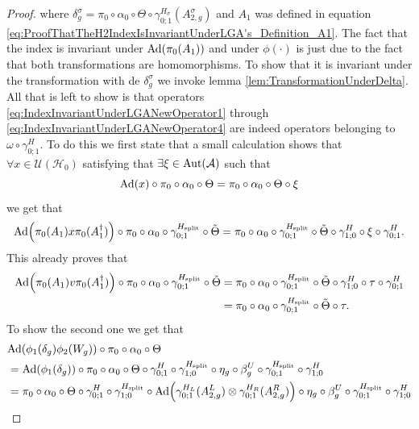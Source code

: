\documentclass[12pt,a4paper,twoside]{article}
\let\originalleft\left
\let\originalright\right
\renewcommand{\left}{\mathopen{}\mathclose\bgroup\originalleft}
\renewcommand{\right}{\aftergroup\egroup\originalright}
\newcommand{\UU}{\mathcal U}
\newcommand{\HH}{\mathcal H}
\renewcommand{\AA}{\mathcal A}
\newcommand{\Ad}[1]{\textrm{Ad}\left(#1\right)}
\newcommand{\Aut}[1]{\textrm{Aut}\left(#1\right)}
\theoremstyle{definition}
\numberwithin{equation}{section}
\begin{document}
\begin{proof}
	where $\delta^\sigma_g=\pi_0\circ\alpha_0\circ\Theta\circ\gamma^{H_\sigma}_{0;1}(A^\sigma_{2,g})$ and $A_1$ was defined in equation \eqref{eq:ProofThatTheH2IndexIsInvariantUnderLGA's_Definition_A1}. The fact that the index is invariant under $\Ad{\pi_0(A_1)}$ and under $\phi(\cdot)$ is just due to the fact that both transformations are homomorphisms. To show that it is invariant under the transformation with de $\delta^\sigma_g$ we invoke lemma \ref{lem:TransformationUnderDelta}. All that is left to show is that operators \eqref{eq:IndexInvariantUnderLGANewOperator1} through \eqref{eq:IndexInvariantUnderLGANewOperator4} are indeed operators belonging to $\omega\circ\gamma^{H}_{0;1}$. To do this we first state that a small calculation shows that $\forall x\in\UU(\HH_0)$ satisfying that $\exists\xi\in\Aut{\AA}$ such that
	\begin{equation}
		\Ad{x}\circ\pi_0\circ\alpha_0\circ\Theta=\pi_0\circ\alpha_0\circ\Theta\circ\xi
	\end{equation}
	we get that
	\begin{equation}\label{eq:IndexInvariantUnderLGA_A1_Transformation}
		\Ad{\pi_0(A_1)x\pi_0(A_1^\dagger)}\circ\pi_0\circ\alpha_0\circ\gamma^{H_\text{split}}_{0;1}\circ\tilde{\Theta}=\pi_0\circ\alpha_0\circ\gamma^{H_\text{split}}_{0;1}\circ\tilde{\Theta}\circ\gamma^H_{1;0}\circ\xi\circ\gamma^H_{0;1}.
	\end{equation}
	This already proves that
	\begin{align}
		\Ad{\pi_0(A_1)v\pi_0(A_1^\dagger)}\circ\pi_0\circ\alpha_0\circ\gamma^{H_\text{split}}_{0;1}\circ\tilde{\Theta}&=\pi_0\circ\alpha_0\circ\gamma^{H_\text{split}}_{0;1}\circ\tilde{\Theta}\circ\gamma^H_{1;0}\circ\tau\circ\gamma^H_{0;1}\\
		&=\pi_0\circ\alpha_0\circ\gamma^{H_\text{split}}_{0;1}\circ\tilde{\Theta}\circ\tau.
	\end{align}
	To show the second one we get that
	\begin{align}
		&\Ad{\phi_1(\delta_g)\phi_2(W_g)}\circ\pi_0\circ\alpha_0\circ\Theta\\
		&=\Ad{\phi_1(\delta_g)}\circ\pi_0\circ\alpha_0\circ\Theta\circ\gamma^{H}_{0;1}\circ\gamma^{H_\text{split}}_{1;0}\circ\eta_g\circ\beta_g^U\circ\gamma^{H_\text{split}}_{0;1}\circ\gamma^H_{1;0}\\
		&=\pi_0\circ\alpha_0\circ\Theta\circ\gamma^{H}_{0;1}\circ\gamma^{H_\text{split}}_{1;0}\circ\Ad{\gamma^{H_L}_{0;1}(A_{2,g}^L)\otimes\gamma^{H_R}_{0;1}(A_{2,g}^R)}\circ\eta_g\circ\beta_g^U\circ\gamma^{H_\text{split}}_{0;1}\circ\gamma^H_{1;0}\\

\end{align}
\end{proof}
\end{document}
